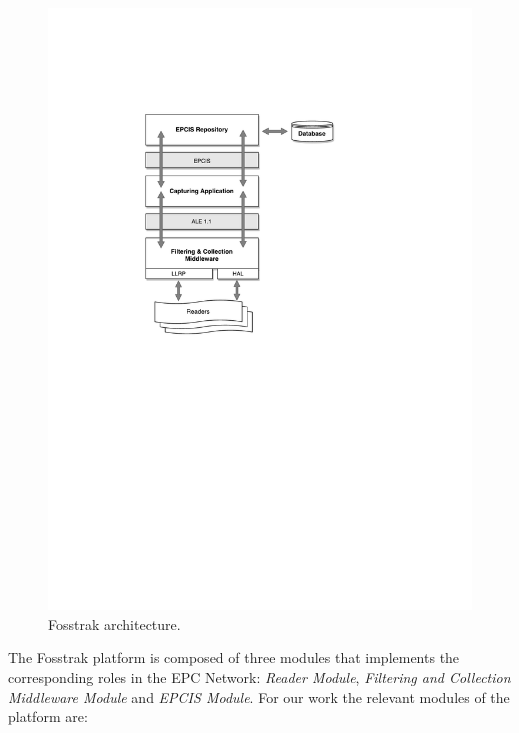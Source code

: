 \begin{figure}[ht!]
  \centering
  \includegraphics[width=.65\textwidth]{./images/fosstrak_architecture}
  \caption{Fosstrak architecture.}
  \label{fig:fosstrak_architecture}
\end{figure}

The Fosstrak platform is composed of three modules that implements the corresponding roles in the
\gls{EPC} Network: \textit{Reader Module}, \textit{Filtering and Collection Middleware Module} and
\textit{EPCIS Module}. For our work the relevant modules of the platform are:

